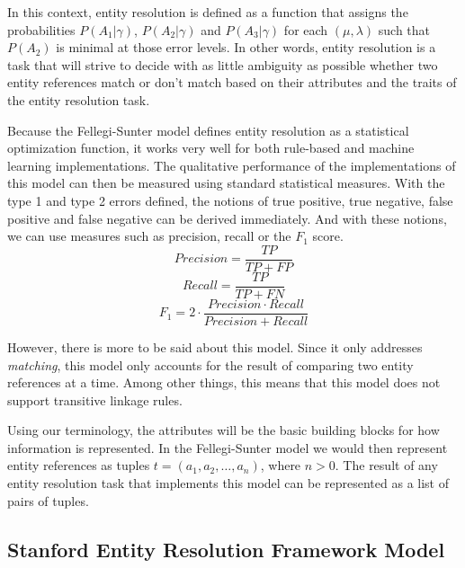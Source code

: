 \documentclass[11pt]{article}
\begin{document}
    In this context, entity resolution is defined as a function that assigns the
    probabilities $P(A_1|\gamma)$, $P(A_2|\gamma)$ and $P(A_3|\gamma)$ for each
    $(\mu, \lambda)$ such that $P(A_2)$ is minimal at those error levels.
    In other words, entity resolution is a task that will strive to decide with
    as little ambiguity as possible whether two entity references match or don't
    match based on their attributes and the traits of the entity resolution
    task.

    Because the Fellegi-Sunter model defines entity resolution as a statistical
    optimization function, it works very well for both
    rule-based\cite{oyster2012} and machine learning\cite{deepm2020}
    implementations.
    The qualitative performance of the implementations of this model can then be
    measured using standard statistical measures.
    With the type 1 and type 2 errors defined, the notions of true positive,
    true negative, false positive and false negative can be derived immediately.
    And with these notions, we can use measures such as precision, recall or
    the $F_1$ score.
    $$Precision=\frac{TP}{TP+FP}$$
    $$Recall=\frac{TP}{TP+FN}$$
    $$F_1=2 \cdot \frac{Precision \cdot Recall}{Precision+Recall}$$

    However, there is more to be said about this model.
    Since it only addresses \textit{matching}, this model only accounts for
    the result of comparing two entity references at a time\cite{Kon19}.
    Among other things, this means that this model does not support transitive
    linkage rules\cite{Tal11}.

    Using our terminology, the attributes will be the basic building blocks for
    how information is represented.
    In the Fellegi-Sunter model we would then represent entity references as
    tuples $t=(a_1,a_2,\ldots,a_n)$, where $n>0$.
    The result of any entity resolution task that implements this model can be
    represented as a list of pairs of tuples.
    
    \subsection[serf]{Stanford Entity Resolution Framework Model}\label{subsec:serf}
\end{document}
